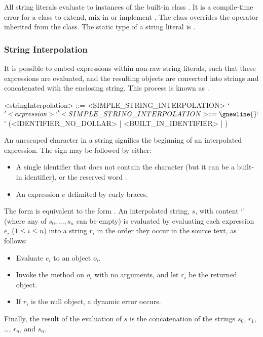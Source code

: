 \documentclass[makeidx]{article}
\begin{document}
{\LMHash{}%
All string literals evaluate to instances of the built-in class .
It is a compile-time error for a class to
extend, mix in or implement .
The  class overrides the \lit{==} operator inherited from
the  class.
The static type of a string literal is .


\subsubsection{String Interpolation}

\LMHash{}%
It is possible to embed expressions within non-raw string literals,
such that these expressions are evaluated,
and the resulting objects are converted into strings and
concatenated with the enclosing string.
This process is known as .

\begin{grammar}
<stringInterpolation> ::= <SIMPLE\_STRING\_INTERPOLATION>
  \alt `${' <expression> `}'

<SIMPLE\_STRING\_INTERPOLATION> ::= \gnewline{}
  `$' (<IDENTIFIER\_NO\_DOLLAR> | <BUILT\_IN\_IDENTIFIER> | \THIS)
\end{grammar}


\LMHash{}%
An unescaped \lit{\$} character in a string signifies
the beginning of an interpolated expression.
The \lit{\$} sign may be followed by either:
\begin{itemize}
\item A single identifier \id{} that does not contain the \lit{\$} character
  (but it can be a built-in identifier),
  or the reserved word \THIS.
\item An expression $e$ delimited by curly braces.
\end{itemize}

\LMHash{}%
The form \code{\$\id} is equivalent to the form \code{\$\{\id\}}.
An interpolated string, $s$, with content
`'
(where any of $s_0, \ldots, s_n$ can be empty)
is evaluated by evaluating each expression $e_i$ ($1 \le i \le n$)
into a string $r_i$ in the order they occur in the source text, as follows:
\begin{itemize}
\item Evaluate $e_i$ to an object $o_i$.
\item Invoke the  method on $o_i$ with no arguments,
  and let $r_i$ be the returned object.
\item If $r_i$ is the null object, a dynamic error occurs.
\end{itemize}
Finally, the result of the evaluation of $s$ is
the concatenation of the strings $s_0$, $r_1$, \ldots, $r_n$, and $s_n$.


}
\end{document}
